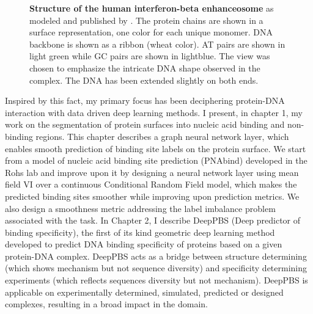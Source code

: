 \begin{center}
    \begin{figure}[H]
        \caption[Structure of the human interferon-beta enhanceosome]{\textbf{ Structure of the human interferon-beta enhanceosome} as modeled and published by \citet{panne2007atomic}. The protein chains are shown in a surface representation, one color for each unique monomer. DNA backbone is shown as a ribbon (wheat color). AT pairs are shown in light green while GC pairs are shown in lightblue. The view was chosen to emphasize the intricate DNA shape observed in the complex. The DNA has been extended slightly on both ends.}
  \label{fig:mmc2}
\end{figure}
\end{center}

Inspired by this fact, my primary focus has been deciphering protein-DNA interaction with data driven deep learning methods. I present, in chapter 1,
my work on the segmentation of protein surfaces into nucleic acid binding and non-binding regions. This chapter describes a graph neural network layer, which enables smooth prediction of binding site labels on the protein surface. We start from a model of nucleic acid binding site
prediction (PNAbind) developed in the Rohs lab and improve upon it by designing a neural network layer using mean field
VI over a continuous Conditional Random Field model, which makes the predicted binding sites smoother while improving upon prediction metrics. We also design a smoothness metric addressing the label imbalance problem associated with the task.
In Chapter 2, I describe DeepPBS (Deep predictor of binding specificity), the first of its kind geometric deep learning method developed to predict DNA binding specificity of proteins based on a given protein-DNA complex. DeepPBS acts as a bridge between structure determining (which shows mechanism but not sequence diversity) and specificity determining experiments (which reflects sequences diversity but not mechanism). DeepPBS is applicable on experimentally determined, simulated, predicted or designed complexes, resulting in a broad impact in the domain.

